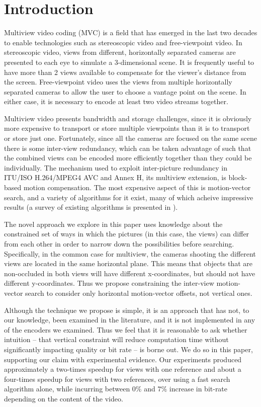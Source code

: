 \documentclass{sig-alternate-05-2015}
\begin{document}

\section{Introduction} %
\label{sec:introduction} %
Multiview video coding (MVC) is a field that has emerged in the last two decades
to enable technologies such as stereoscopic video and free-viewpoint video. In
stereoscopic video, views from different, horizontally separated cameras are
presented to each eye to simulate a 3-dimensional scene. It is frequently useful
to have more than 2 views available to compensate for the viewer's distance from
the screen. Free-viewpoint video uses the views from multiple horizontally
separated cameras to allow the user to choose a vantage point on the scene. In
either case, it is necessary to encode at least two video streams together.

Multiview video presents bandwidth and storage challenges, since it is obviously
more expensive to transport or store multiple viewpoints than it is to transport
or store just one. Fortunately, since all the cameras are focused on the same
scene there is some inter-view redundancy, which can be taken advantage of such
that the combined views can be encoded more efficiently together than they could
be individually. The mechanism used to exploit inter-picture redundancy in
ITU/ISO H.264/MPEG4 AVC and Annex H, its multiview extension, is block-based
motion compensation. The most expensive aspect of this is motion-vector search,
and a variety of algorithms for it exist, many of which acheive impressive
results (a survey of existing algorithms is presented in \cite{khattak:fast}).

The novel approach we explore in this paper uses knowledge about the constrained
set of ways in which the pictures (in this case, the views) can differ from each
other in order to narrow down the possibilities before searching. Specifically,
in the common case for multiview, the cameras shooting the different views are
located in the same horizontal plane. This means that objects that are
non-occluded in both views will have different x-coordinates, but should not
have different y-coordinates. Thus we propose constraining the inter-view
motion-vector search to consider only horizontal motion-vector offsets, not
vertical ones.

Although the technique we propose is simple, it is an approach that has not, to
our knowledge, been examined in the literature, and it is not implemented in any
of the encoders we examined. Thus we feel that it is reasonable to ask whether
intuition -- that vertical constraint will reduce computation time without
significantly impacting quality or bit rate -- is borne out. We do so in this
paper, supporting our claim with experimental evidence. Our experiments produced
approximately a two-times speedup for views with one reference and about a
four-times speedup for views with two references, over using a fast search
algorithm alone, while incurring between $0\%$ and $7\%$ increase in bit-rate
depending on the content of the video.
\end{document}
